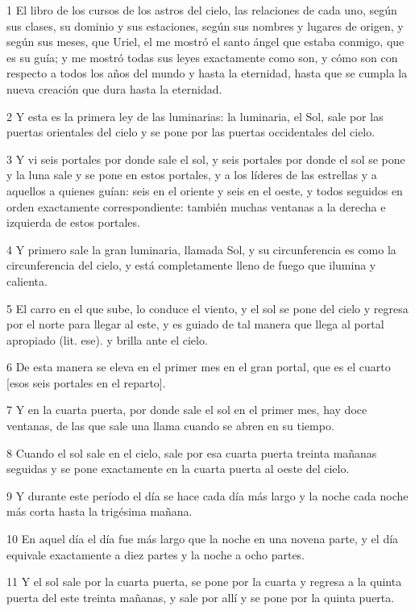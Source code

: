 \par 1 El libro de los cursos de los astros del cielo, las relaciones de cada uno, según sus clases, su dominio y sus estaciones, según sus nombres y lugares de origen, y según sus meses, que Uriel, el me mostró el santo ángel que estaba conmigo, que es su guía; y me mostró todas sus leyes exactamente como son, y cómo son con respecto a todos los años del mundo y hasta la eternidad, hasta que se cumpla la nueva creación que dura hasta la eternidad.
\par 2 Y esta es la primera ley de las luminarias: la luminaria, el Sol, sale por las puertas orientales del cielo y se pone por las puertas occidentales del cielo.
\par 3 Y vi seis portales por donde sale el sol, y seis portales por donde el sol se pone y la luna sale y se pone en estos portales, y a los líderes de las estrellas y a aquellos a quienes guían: seis en el oriente y seis en el oeste, y todos seguidos en orden exactamente correspondiente: también muchas ventanas a la derecha e izquierda de estos portales.
\par 4 Y primero sale la gran luminaria, llamada Sol, y su circunferencia es como la circunferencia del cielo, y está completamente lleno de fuego que ilumina y calienta.
\par 5 El carro en el que sube, lo conduce el viento, y el sol se pone del cielo y regresa por el norte para llegar al este, y es guiado de tal manera que llega al portal apropiado (lit. ese). y brilla ante el cielo.
\par 6 De esta manera se eleva en el primer mes en el gran portal, que es el cuarto [esos seis portales en el reparto].
\par 7 Y en la cuarta puerta, por donde sale el sol en el primer mes, hay doce ventanas, de las que sale una llama cuando se abren en su tiempo.
\par 8 Cuando el sol sale en el cielo, sale por esa cuarta puerta treinta mañanas seguidas y se pone exactamente en la cuarta puerta al oeste del cielo.
\par 9 Y durante este período el día se hace cada día más largo y la noche cada noche más corta hasta la trigésima mañana.
\par 10 En aquel día el día fue más largo que la noche en una novena parte, y el día equivale exactamente a diez partes y la noche a ocho partes.
\par 11 Y el sol sale por la cuarta puerta, se pone por la cuarta y regresa a la quinta puerta del este treinta mañanas, y sale por allí y se pone por la quinta puerta.
